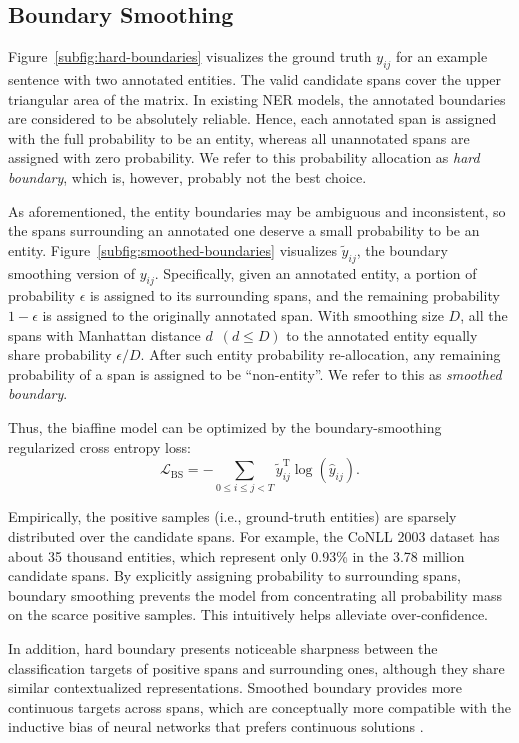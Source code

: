 \documentclass[11pt]{article}
\begin{document}
\subsection{Boundary Smoothing} 
Figure~\ref{subfig:hard-boundaries} visualizes the ground truth $y_{ij}$ for an example sentence with two annotated entities. The valid candidate spans cover the upper triangular area of the matrix. In existing NER models, the annotated boundaries are considered to be absolutely reliable. Hence, each annotated span is assigned with the full probability to be an entity, whereas all unannotated spans are assigned with zero probability. We refer to this probability allocation as \emph{hard boundary}, which is, however, probably not the best choice. 

As aforementioned, the entity boundaries may be ambiguous and inconsistent, so the spans surrounding an annotated one deserve a small probability to be an entity. Figure~\ref{subfig:smoothed-boundaries} visualizes $\tilde{y}_{ij}$, the boundary smoothing version of $y_{ij}$. Specifically, given an annotated entity, a portion of probability $\epsilon$ is assigned to its surrounding spans, and the remaining probability $1 - \epsilon$ is assigned to the originally annotated span. With smoothing size $D$, all the spans with Manhattan distance $d$~$(d \leq D)$ to the annotated entity equally share probability $\epsilon / D$. After such entity probability re-allocation, any remaining probability of a span is assigned to be ``non-entity''. We refer to this as \emph{smoothed boundary}. 


Thus, the biaffine model can be optimized by the boundary-smoothing regularized cross entropy loss: 
\begin{equation}
    \mathcal{L}_\mathrm{BS} = -\sum_{0 \leq i \leq j < T} \tilde{y}_{ij}^{\mathrm T} \log(\hat{y}_{ij}).
\end{equation}

Empirically, the positive samples (i.e., ground-truth entities) are sparsely distributed over the candidate spans. For example, the CoNLL 2003 dataset has about 35 thousand entities, which represent only 0.93\% in the 3.78 million candidate spans. By explicitly assigning probability to surrounding spans, boundary smoothing prevents the model from concentrating all probability mass on the scarce positive samples. This intuitively helps alleviate over-confidence. 

In addition, hard boundary presents noticeable sharpness between the classification targets of positive spans and surrounding ones, although they share similar contextualized representations. Smoothed boundary provides more continuous targets across spans, which are conceptually more compatible with the inductive bias of neural networks that prefers continuous solutions \citep{hornik1989multilayer}. 
\end{document}
